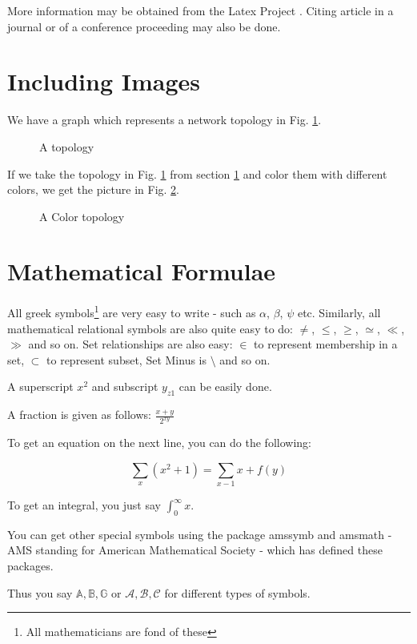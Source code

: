 \documentclass[a4paper,10pt]{article}
\begin{document}
More information may be obtained from the Latex Project \cite{latex-pro}. Citing
article in a journal \cite{art} or of a conference proceeding \cite{conf} may
also be done.

\section{Including Images}
\label{images}

We have a graph which represents a network topology in Fig. \ref{topo}.

\begin{figure}[ht]
\centering
\caption{A topology}
\label{topo}
\end{figure}

If we take the topology in Fig. \ref{topo} from section \ref{images} and color 
them with different colors, we get the picture in Fig. \ref{color}.

\begin{figure}[ht]
\centering
\caption{A Color topology}
\label{color}
\end{figure}

\section{Mathematical Formulae}

All greek symbols\footnote{All mathematicians are fond of these} are very 
easy to write - such as $\alpha$, $\beta$, $\psi$ etc. Similarly, all 
mathematical relational symbols are also quite easy to do: $\neq$, 
$\leq$, $\geq$, $\simeq$, $\ll$, $\gg$ and so on. Set relationships are 
also easy: $\in$ to represent membership in a set, $\subset$ to represent 
subset,  Set Minus is $\setminus$ and so on.

A superscript $x^2$ and subscript $y_{z1}$ can be easily done.

A fraction is given as follows: $\frac{x+y}{2^{xy}}$

To get an equation on the next line, you can do the following:

\[
 \sum_x(x^2+1) = \sum_{x-1}x + f(y)
\]

To get an integral, you just say $\int_0^\infty x$.

You can get other special symbols using the package amssymb and amsmath - AMS 
standing for American Mathematical Society - which has defined these packages.

Thus you say $\mathbb{A, B, G}$ or $\mathcal{A, B, C}$ for different types of 
symbols.
\end{document}
